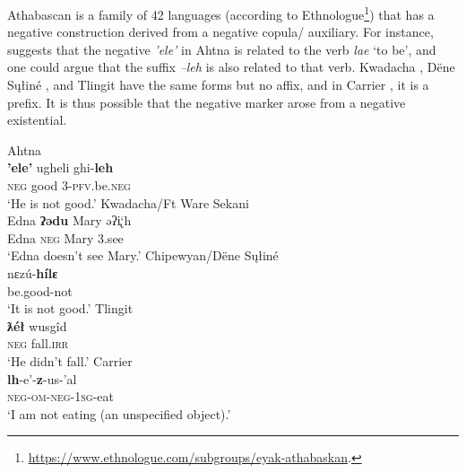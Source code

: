 \documentclass[output=paper,draft,draftmode,colorlinks,citecolor=brown]{langscibook}
\begin{document}
Athabascan is a family of 42 languages (according to Ethnologue\footnote{
\href{https://www.ethnologue.com/subgroups/eyak-athabaskan}{https://www.ethnologue.com/subgroups/eyak-athabaskan}.})
that has a negative construction derived from a negative copula\slash
auxiliary. For instance, \citet{Kari1990} suggests that the negative
\textit{'ele'}
in Ahtna  is related to the verb
\textit{lae} `to be', and one could argue that the suffix \textit{–leh} is
also related to that verb.  Kwadacha , Dëne
S\k{u}łiné , and Tlingit
 have the same forms but no affix, and in
Carrier , it is a prefix. It is thus possible
that the negative marker arose from a negative existential.
%
\begin{exe}
    \ex Ahtna \label{ex:other-ahtna-good}\\
    \gll \textbf{{'ele'}}  ugheli  ghi-\textbf{leh} \\
\textsc{neg}  good  3-\textsc{pfv}.be.\textsc{neg} \\
    \glt `He is not good.' \citep[272]{Kari1990}
    \ex Kwadacha\slash Ft Ware Sekani
    \label{ex:other-kwadacha-Edna}\\
    \gll Edna   \textbf{ʔədu}  Mary  əʔi̢`h        \\
Edna  \textsc{neg}  Mary  3.see \\
    \glt `Edna doesn't see Mary.' \citep[110]{Hargus2002}
    \ex Chipewyan\slash Dëne S\k{u}łiné
    \label{ex:other-chipewyan-good}\\
    \gll nεzú-\textbf{hílε} \\
    be.good-not \\
    \glt `It is not good.' \citep[420]{Li1967}
    \ex Tlingit \label{ex:other-tlingit-fall}\\
    \gll \textbf{ƛéł}  wusgîd            \\
    \textsc{neg}  fall.\textsc{irr} \\
    \glt `He didn't fall.' \citep[72]{Krauss1969} 
    \ex     Carrier \label{ex:other-carrier-eat}\\
    \gll \textbf{lh}-e'-\textbf{z}-us-’al            \\
\textsc{neg-om-neg-1sg}-eat \\
    \glt `I am not eating (an unspecified object).' \citep[26]{Poser2009}
    \end{exe}
\end{document}
